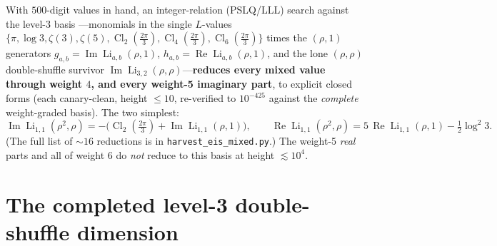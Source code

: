 \documentclass[11pt]{article}
\DeclareMathOperator{\Li}{Li}
\DeclareMathOperator{\Cl}{Cl}
\DeclareMathOperator{\Real}{Re}
\DeclareMathOperator{\Imag}{Im}
\newcommand{\rr}{\rho}
\newcommand{\code}[1]{\texttt{\small #1}}
\theoremstyle{plain}
\theoremstyle{remark}
\begin{document}
With $500$-digit values in hand, an integer-relation (PSLQ/LLL) search against the level-3 basis
---monomials in the single $L$-values $\{\pi,\log 3,\zeta(3),\zeta(5),\Cl_2(\tfrac{2\pi}3),
\Cl_4(\tfrac{2\pi}3),\Cl_6(\tfrac{2\pi}3)\}$ times the $(\rr,1)$ generators
$g_{a,b}=\Imag\Li_{a,b}(\rr,1)$, $h_{a,b}=\Real\Li_{a,b}(\rr,1)$, and the lone $(\rr,\rr)$
double-shuffle survivor $\Imag\Li_{3,2}(\rr,\rr)$---\textbf{reduces every mixed value through weight
$4$, and every weight-5 imaginary part}, to explicit closed forms (each canary-clean, height $\le 10$,
re-verified to $10^{-425}$ against the \emph{complete} weight-graded basis). The two simplest:
\begin{equation}\label{eq:eis-w2}
  \Imag\Li_{1,1}(\rr^2,\rr)=-\bigl(\Cl_2(\tfrac{2\pi}3)+\Imag\Li_{1,1}(\rr,1)\bigr),\qquad
  \Real\Li_{1,1}(\rr^2,\rr)=5\,\Real\Li_{1,1}(\rr,1)-\tfrac12\log^2 3.
\end{equation}
(The full list of ${\sim}16$ reductions is in \code{harvest\_eis\_mixed.py}.) The weight-5 \emph{real}
parts and all of weight $6$ do \emph{not} reduce to this basis at height $\lesssim 10^{4}$.

\section{The completed level-3 double-shuffle dimension}\label{sec:eisdim}
\end{document}
